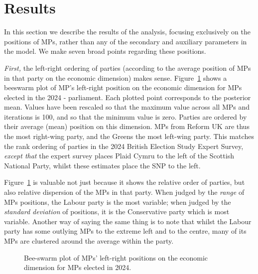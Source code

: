 \documentclass[
]{article}
\begin{document}
\section{Results}\label{results}

In this section we describe the results of the analysis, focusing
exclusively on the positions of MPs, rather than any of the secondary
and auxiliary parameters in the model. We make seven broad points
regarding these positions.

\emph{First,} the left-right ordering of parties (according to the
average position of MPs in that party on the economic dimension) makes
sense. Figure~\ref{fig-bees} shows a beeswarm plot of MP's left-right
position on the economic dimension for MPs elected in the 2024 -
parliament. Each plotted point corresponds to the posterior mean. Values
have been rescaled so that the maximum value across all MPs and
iterations is 100, and so that the minimum value is zero. Parties are
ordered by their average (mean) position on this dimension. MPs from
Reform UK are thus the most right-wing party, and the Greens the most
left-wing party. This matches the rank ordering of parties in the 2024
British Election Study Expert Survey, \emph{except that} the expert
survey places Plaid Cymru to the left of the Scottish National Party,
whilst these estimates place the SNP to the left.

Figure~\ref{fig-bees} is valuable not just because it shows the relative
order of parties, but also relative dispersion of the MPs in that party.
When judged by the \emph{range} of MPs positions, the Labour party is
the most variable; when judged by the \emph{standard deviation} of
positions, it is the Conservative party which is most variable. Another
way of saying the same thing is to note that whilst the Labour party has
some outlying MPs to the extreme left and to the centre, many of its MPs
are clustered around the average within the party.

\begin{figure}


\caption{\label{fig-bees}Bee-swarm plot of MPs' left-right positions on
the economic dimension for MPs elected in 2024.}

\end{figure}%
\end{document}
